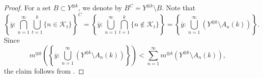 \documentclass[12pt,reqno]{amsart}
\newcommand{\N}{\mathbb{N}}
\newcommand{\Z}{\mathbb{Z}}
\newcommand{\kay}{\mathcal{K}}
\newcommand{\TT}{\widetilde{T}}
\newcommand{\TS}{\widetilde{S}}
\newcommand{\Tmu}{\widetilde{\mu}}
\newcommand{\ignore}[1]{}
\theoremstyle{definition}
\begin{document}
\begin{proof} For a set $B \subset Y^{\otimes k}$, we denote by $B^C = Y^{\otimes k} \setminus B$. Note that
\[
\left\{\overline{y} : \bigcap_{n=1}^{\infty} \bigcup_{t=1}^k \{n \in \kay_t\}\right\}^C = \left\{\overline{y} : \bigcup_{n=1}^{\infty} \bigcap_{t=1}^k \{n \notin \kay_t\}\right\} = \left\{\overline{y} : \bigcup_{n=1}^{\infty} (Y^{\otimes k} \setminus A_n(k))\right\}. 
\]
Since
\[
m^{\otimes k} \left(\left\{\overline{y} : \bigcup_{n=1}^{\infty} (Y^{\otimes k} \setminus A_n(k))\right\}\right) < \sum_{n=1}^{\infty} m^{\otimes k}(Y^{\otimes k} \setminus A_n(k)),
\]
the claim follows from .
\end{proof}
\ignore{
\begin{proof}[Proof of \Cref{thm:recurrence_1}] Denote by $\overline{C} : = \left\{\overline{y} \in Y^{\otimes k} : \bigcap_{n=1}^{\infty} \bigcup_{t=1}^k \{n \in \kay_t\}\right\} \subset Y^{\otimes k}$. In other words
\[
\overline{C} : = \left\{\overline{y} \in Y^{\otimes k} :\,\mathrm{for}\,\,\mathrm{all}\,\,n\in\N,\, \,\mathrm{there}\,\,\mathrm{exists}\, t(n) \in \{1,\ldots,k\},\, \,\mathrm{such}\,\mathrm{that}\,\, n \in \kay_{t(n)}\right\}. 
\] 
We set $A = \overline{C} \times [0]_{(0,0)}^{\otimes k} \subset X$. Then $\mu(A) > 0$, by \Cref{prop:m^k(barC)>0}. For $n \in \N$, let $C(n)$ be the projection of $\overline{C}$ on the $t(n)$-th coordinate. Similarly we denote by $A(n) : = C(n) \times [0]_{(0,0)}$  the projection of $A$ on the $t(n)$-th coordinate. Recall that the set $D \subset Y$ is the full $m$-measure set such that for $y \in Y$ the permutation $\pi_y: \Z^2 \rightarrow \Z^2$ (see \eqref{eq:pi_y}) is well defined. Thus $D^{\otimes k} \subset Y^{\otimes k}$ is a full $m^{\otimes k}$-measure set. We consider the set
\[
B(n) : = \left(D^{\otimes k}\times \Sigma^{\otimes k}\right) \cap T^{-p_1(n)}A\cap S^{-p_2(n)}A
\]
Observe that
\begin{align*}
    \mu(B(n)) &= \mu\left(\left(D^{\otimes k}\times \Sigma^{\otimes k}\right) \cap T^{-p_1(n)}A\cap S^{-p_2(n)}A\right)\\ 
    &\leq \Tmu \left((D\times \Sigma)\cap \TT^{-p_1(n)}(A(n))\cap \TS^{-p_2(n)}(A(n))\right)\\
    &= \Tmu \left((D\times \Sigma)\cap\TT^{-p_1(n)}(C(n) \times [0]_{0,0}), \TS^{-p_2(n)}(C(n) \times [0]_{0,0})\right)\\
   &= \Tmu\left(\{(y,\omega) \in Z : y \in D,\,\mathrm{and}\,\, \TT^{p_1(n)} (y,\omega), \TS^{p_2(n)} (y,\omega) \in C(n) \times [0]_{0,0})\}\right).
\end{align*}

\end{proof}}
\end{document}
